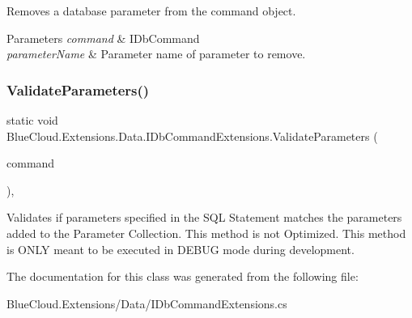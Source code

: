 Removes a database parameter from the command object. 


\begin{DoxyParams}{Parameters}
{\em command} & I\+Db\+Command\\
\hline
{\em parameter\+Name} & Parameter name of parameter to remove.\\
\hline
\end{DoxyParams}
\mbox{\label{class_blue_cloud_1_1_extensions_1_1_data_1_1_i_db_command_extensions_a823e1e5bb08e6a7970e88c262b0d8945}} 
\subsubsection{\texorpdfstring{Validate\+Parameters()}{ValidateParameters()}}
{\footnotesize\ttfamily static void Blue\+Cloud.\+Extensions.\+Data.\+I\+Db\+Command\+Extensions.\+Validate\+Parameters (\begin{DoxyParamCaption}\item[{this I\+Db\+Command}]{command }\end{DoxyParamCaption})\hspace{0.3cm}{\ttfamily [inline]}, {\ttfamily [static]}}



Validates if parameters specified in the S\+QL Statement matches the parameters added to the Parameter Collection. This method is not Optimized. This method is O\+N\+LY meant to be executed in D\+E\+B\+UG mode during development. 



The documentation for this class was generated from the following file\+:\begin{DoxyCompactItemize}
\item 
Blue\+Cloud.\+Extensions/\+Data/I\+Db\+Command\+Extensions.\+cs\end{DoxyCompactItemize}
